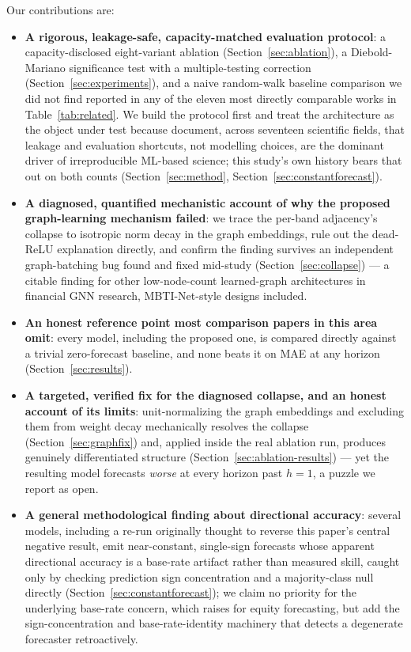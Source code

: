 \documentclass[journal]{IEEEtran}
\begin{document}
Our contributions are:
\begin{itemize}
    \item \textbf{A rigorous, leakage-safe, capacity-matched evaluation protocol}: a capacity-disclosed eight-variant ablation (Section~\ref{sec:ablation}), a Diebold-Mariano significance test with a multiple-testing correction (Section~\ref{sec:experiments}), and a naive random-walk baseline comparison we did not find reported in any of the eleven most directly comparable works in Table~\ref{tab:related}. We build the protocol first and treat the architecture as the object under test because \citet{KapoorNarayanan2022} document, across seventeen scientific fields, that leakage and evaluation shortcuts, not modelling choices, are the dominant driver of irreproducible ML-based science; this study's own history bears that out on both counts (Section~\ref{sec:method}, Section~\ref{sec:constantforecast}).
    \item \textbf{A diagnosed, quantified mechanistic account of why the proposed graph-learning mechanism failed}: we trace the per-band adjacency's collapse to isotropic norm decay in the graph embeddings, rule out the dead-ReLU explanation directly, and confirm the finding survives an independent graph-batching bug found and fixed mid-study (Section~\ref{sec:collapse}) --- a citable finding for other low-node-count learned-graph architectures in financial GNN research, MBTI-Net-style designs included.
    \item \textbf{An honest reference point most comparison papers in this area omit}: every model, including the proposed one, is compared directly against a trivial zero-forecast baseline, and none beats it on MAE at any horizon (Section~\ref{sec:results}).
    \item \textbf{A targeted, verified fix for the diagnosed collapse, and an honest account of its limits}: unit-normalizing the graph embeddings and excluding them from weight decay mechanically resolves the collapse (Section~\ref{sec:graphfix}) and, applied inside the real ablation run, produces genuinely differentiated structure (Section~\ref{sec:ablation-results}) --- yet the resulting model forecasts \emph{worse} at every horizon past $h=1$, a puzzle we report as open.
    \item \textbf{A general methodological finding about directional accuracy}: several models, including a re-run originally thought to reverse this paper's central negative result, emit near-constant, single-sign forecasts whose apparent directional accuracy is a base-rate artifact rather than measured skill, caught only by checking prediction sign concentration and a majority-class null directly (Section~\ref{sec:constantforecast}); we claim no priority for the underlying base-rate concern, which \citet{Cheung2026} raises for equity forecasting, but add the sign-concentration and base-rate-identity machinery that detects a degenerate forecaster retroactively.
\end{itemize}
\end{document}
